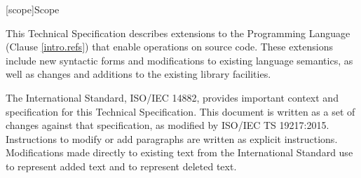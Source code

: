 
[scope]{Scope}

\pnum
This Technical Specification describes extensions to the \Cpp Programming
Language (Clause \ref{intro.refs}) that enable operations on source code. These
extensions include new syntactic forms and modifications to existing language
semantics, as well as changes and additions to the existing library facilities.

\pnum
The International Standard, ISO/IEC 14882, provides important context and
specification for this Technical Specification.  This document is written as a
set of changes against that specification, as modified by ISO/IEC TS 19217:2015.
Instructions to modify or add paragraphs are written as explicit instructions.
Modifications made directly to existing text from the International Standard use
 to represent added text and  to
represent deleted text.
